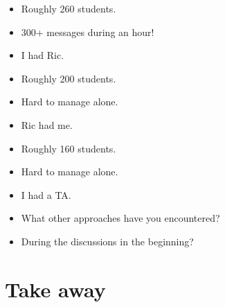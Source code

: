 \begin{frame}
  \begin{example}
    \begin{itemize}
      \item Roughly 260 students.
      \item 300+ messages during an hour!
      \item I had Ric.
    \end{itemize}
  \end{example}

  \pause

  \begin{example}
    \begin{itemize}
      \item Roughly 200 students.
      \item Hard to manage alone.
      \item Ric had me.
    \end{itemize}
  \end{example}
\end{frame}

\begin{frame}
  \begin{example}
    \begin{itemize}
      \item Roughly 160 students.
      \item Hard to manage alone.
      \item I had a TA.
    \end{itemize}
  \end{example}
\end{frame}

\begin{frame}
  \begin{question}
    \begin{itemize}
      \item What other approaches have you encountered?
      \item During the discussions in the beginning?
    \end{itemize}
  \end{question}
\end{frame}

\section{Take away}

